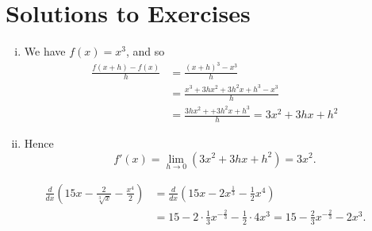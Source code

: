\documentclass[12pt]{article}
\theoremstyle{definition} %
\begin{document}
\section*{Solutions to Exercises}
\begin{enumerate}[(i)]
\item We have $f(x)=x^3$, and so
	\begin{align*}
	\frac{f(x+h)-f(x)}{h} &= \frac{(x+h)^3 - x^3}{h} \\
	&= \frac{x^3 + 3hx^2 + 3h^2x + h^3 - x^3}{h} \\
	&= \frac{3hx^2++3h^2x+h^3}{h} = 3x^2 +3hx +h^2
	\end{align*}
\item Hence 
	\[f'(x) = \lim_{h\rightarrow 0}\left(3x^2 +3hx +h^2\right)=3x^2.\]
\end{enumerate}

	\begin{align*}
	\frac{d}{dx}\left( 15x-\frac{2}{\sqrt[3]{x}}-\frac{x^4}{2} \right) &= \frac{d}{dx}\left( 15x-2x^{\frac{1}{3}}-\frac{1}{2}x^4\right) \\
	&=15-2\cdot\frac{1}{3}x^{-\frac{2}{3}}-\frac{1}{2}\cdot 4x^3 = 15-\frac{2}{3}x^{-\frac{2}{3}}-2x^3.
	\end{align*} 
	
\end{document}
